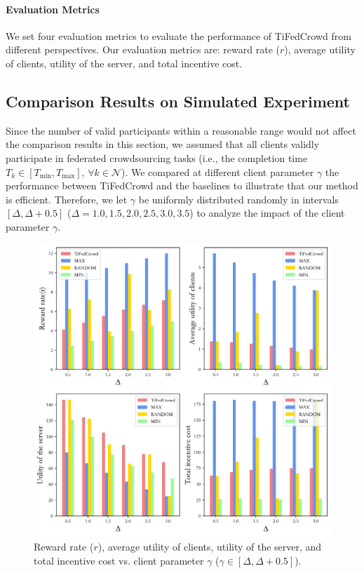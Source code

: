 \documentclass[final,1p,times]{elsarticle}
\begin{document}
\paragraph{\textbf{Evaluation Metrics}}
We set four evaluation metrics to evaluate the performance of TiFedCrowd from different perspectives. Our evaluation metrics are: reward rate ($r$), average utility of clients, utility of the server, and total incentive cost. 
\subsection{Comparison Results on Simulated Experiment} \label{PCWB}
Since the number of valid participants within a reasonable range would not affect the comparison results in this section, we assumed that all clients validly participate in federated crowdsourcing tasks (i.e., the completion time $T_k\in[T_{\min},T_{\max}],\,\forall k\in\bm{\mathcal{N}}$).
We compared at different client parameter $\gamma$ the performance between TiFedCrowd and the baselines to illustrate that our method is efficient. Therefore, we let $\gamma$ be uniformly distributed randomly in intervals $[\Delta, \Delta + 0.5]$ ($\Delta = 1.0, 1.5, 2.0, 2.5, 3.0, 3.5$) to analyze the impact of the client parameter $\gamma$.

\begin{figure}
	\centering
	\centerline{\includegraphics[width=5.5in]{fig2.pdf}}
	\caption{Reward rate ($r$), average utility of clients, utility of the server, and total incentive cost vs. client parameter $\gamma$ ($\gamma\in[\Delta,\Delta+0.5]$).}
	\label{fig:2}
\end{figure}
\end{document}
